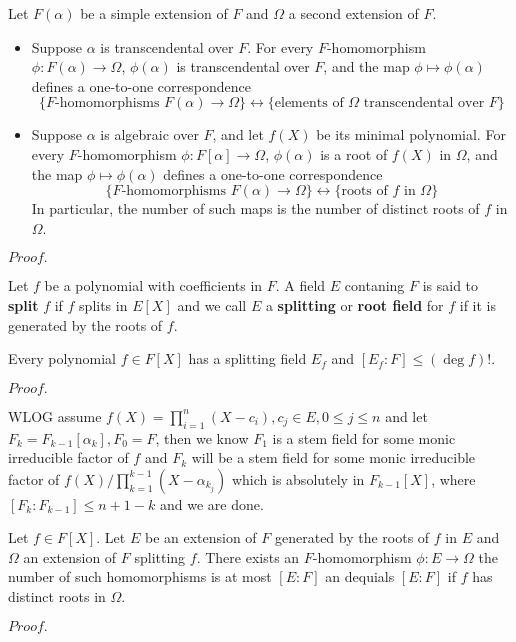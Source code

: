 \documentclass{article}
\newcommand{\Pf}[1]{$Proof.$\par}
\begin{document}
\begin{proposition}
    Let $F(\alpha)$ be a simple extension of $F$ and $\Omega$ a second extension of $F$.\par
    \begin{itemize}
        \item Suppose $\alpha$ is transcendental over $F$. For every $F$-homomorphism $\phi:F(\alpha) \to \Omega$, $\phi(\alpha)$ is transcendental over $F$, and the map $\phi\mapsto \phi(\alpha)$ defines a one-to-one correspondence
        \[\{F\text{-homomorphisms } F(\alpha) \to \Omega \}\leftrightarrow \{\text{elements of } \Omega \text{ transcendental over }F\}\]
        \item Suppose $\alpha$ is algebraic over $F$, and let $f(X)$ be its minimal polynomial. For every $F$-homomorphism $\phi:F[\alpha]\to \Omega$, $\phi(\alpha)$ is a root of $f(X)$ in $\Omega$, and the map $\phi \mapsto \phi(\alpha)$ defines a one-to-one correspondence
        \[\{F\text{-homomorphisms } F(\alpha) \to \Omega \}\leftrightarrow \{\text{roots of } f \text{ in }\Omega\}\]
        In particular, the number of such maps is the number of distinct roots of $f$ in $\Omega$.
    \end{itemize}
\end{proposition}
\Pf\par

\begin{definition}
    Let $f$ be a polynomial with coefficients in $F$. A field $E$ contaning $F$ is said to \textbf{split} $f$ if $f$ splits in $E[X]$ and we call $E$ a \textbf{splitting} or \textbf{root field} for $f$ if it is generated by the roots of $f$.
\end{definition}

\begin{proposition}
    Every polynomial $f\in F[X]$ has a splitting field $E_f$ and $[E_f:F] \leq (\deg f)!$.
\end{proposition}
\Pf\par
    WLOG assume $f(X) =\prod_{i=1}^n(X-c_i), c_j \in E, 0\leq j \leq n$ and let $F_k = F_{k-1}[\alpha_k], F_0 = F$, then we know $F_1$ is a stem field for some monic irreducible factor of $f$ and $F_k$ will be a stem field for some monic irreducible factor of $f(X)/\prod_{k=1}^{k-1}(X-\alpha_{k_j})$ which is absolutely in $F_{k-1}[X]$, where $[F_k:F_{k-1}] \leq n+1-k$ and we are done.

\begin{proposition}
    Let $f\in F[X]$. Let $E$ be an extension of $F$ generated by the roots of $f$ in $E$ and $\Omega$ an extension of $F$ splitting $f$. There exists an $F$-homomorphism $\phi:E\to \Omega$ the number of such homomorphisms is at most $[E:F]$ an dequials $[E:F]$ if $f$ has distinct roots in $\Omega$.
\end{proposition}
\Pf\par
    
\end{document}
